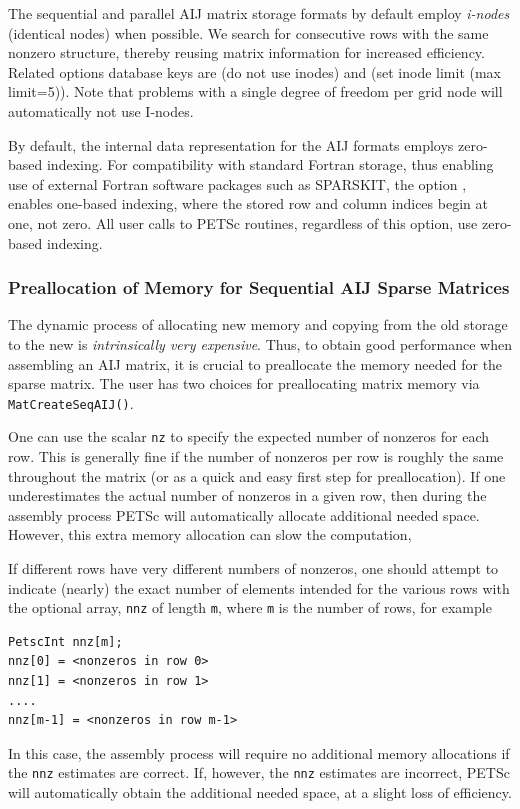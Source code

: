 The sequential and parallel AIJ matrix storage formats by default
employ {\em i-nodes} (identical nodes) when possible.  We search for
consecutive rows with the same nonzero structure, thereby reusing
matrix information for increased efficiency.  Related options database
keys are  (do not use inodes) and  (set inode limit (max limit=5)).
Note that problems with a single degree of freedom per grid node
will automatically not use I-nodes.

By default, the internal data representation for the AIJ formats employs
zero-based indexing.  For compatibility with standard Fortran storage,
thus enabling use of external Fortran software packages such as
SPARSKIT,  the option ,
 enables one-based indexing, where the stored
row and column indices begin at one, not zero.  All user calls to
PETSc routines, regardless of this option, use zero-based indexing.

\subsubsection{Preallocation of Memory for Sequential AIJ Sparse Matrices}

The dynamic process of allocating new memory and copying from the old
storage to the new is {\em intrinsically very expensive}.  Thus, to
obtain good performance when assembling an AIJ matrix, it is crucial
to preallocate the memory needed for the sparse matrix.  The user has
two choices for preallocating matrix memory via \lstinline{MatCreateSeqAIJ()}.

One can use the scalar \lstinline{nz} to specify the expected
number of nonzeros for each row.  This is generally fine if the number
of nonzeros per row is roughly the same throughout the matrix (or as a
quick and easy first step for preallocation).  If one underestimates
the actual number of nonzeros in a given row, then during the assembly
process PETSc will automatically allocate additional needed space.
However, this extra memory allocation can slow the computation,

If different rows have very different numbers of nonzeros, one
should attempt to indicate (nearly) the exact number of elements
intended for the various rows with the optional array, \lstinline{nnz} of
length \lstinline{m}, where \lstinline{m} is the number of rows, for example
\begin{lstlisting}
PetscInt nnz[m];
nnz[0] = <nonzeros in row 0>
nnz[1] = <nonzeros in row 1>
....
nnz[m-1] = <nonzeros in row m-1>
\end{lstlisting}
In this case, the assembly process will require no additional memory
allocations if the \lstinline{nnz} estimates are correct. If, however,
the \lstinline{nnz} estimates are incorrect, PETSc will automatically
obtain the additional needed space, at a slight loss of efficiency.

